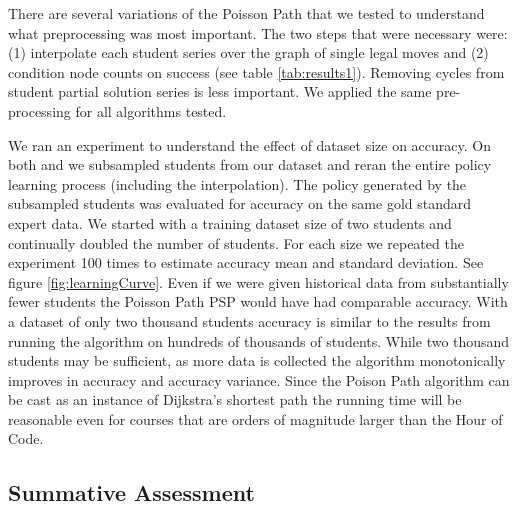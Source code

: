There are several variations of the Poisson Path that we tested to understand what preprocessing was most important. The two steps that were necessary were: (1) interpolate each student series over the graph of single legal moves and (2) condition node counts on success (see table \ref{tab:results1}). Removing cycles from student partial solution series is less important. We applied the same pre-processing for all algorithms tested.

We ran an experiment to understand the effect of dataset size on accuracy. On both \Pa and \Pb we subsampled students from our dataset and reran the entire policy learning process (including the interpolation). The policy generated by the subsampled students was evaluated for accuracy on the same gold standard expert data. We started with a training dataset size of two students and continually doubled the number of students. For each size we repeated the experiment 100 times to estimate accuracy mean and standard deviation.  See figure \ref{fig:learningCurve}. Even if we were given historical data from substantially fewer students the Poisson Path PSP would have had comparable accuracy. With a dataset of only two thousand students accuracy is similar to the results from running the algorithm on hundreds of thousands of students. While two thousand students may be sufficient, as more data is collected the algorithm monotonically improves in accuracy and accuracy variance. Since the Poison Path algorithm can be cast as an instance of Dijkstra's shortest path the running time will be reasonable even for courses that are orders of magnitude larger than the Hour of Code.



\subsection{Summative Assessment}

